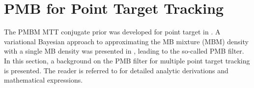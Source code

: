 

\section{PMB for Point Target Tracking}
The PMBM MTT conjugate prior was developed for point target in \cite{pmbmpoint,pmbmpoint2}. A variational Bayesian approach to approximating the MB mixture (MBM) density with a single MB density was presented in \cite{variational}, leading to the so-called PMB filter. In this section, a background on the PMB filter for multiple point target tracking is presented. The reader is referred to \cite{variational,pmbmpoint} for detailed analytic derivations and mathematical expressions.

